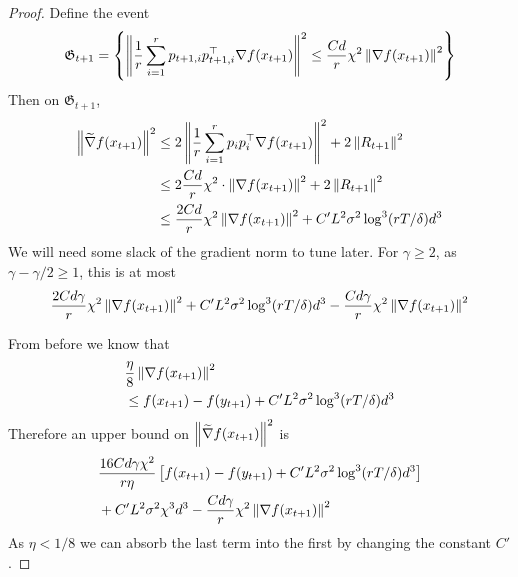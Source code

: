 \begin{proof}
    Define the event
    \begin{align*}
        \mathfrak G_{t+1} = \left\{\left\lVert \frac 1r \sum_{i=1}^r p_{t+1,i}p_{t+1,i}^\top \nabla f(x_{t+1}) \right\rVert^2 \leq \frac{Cd}{r} \chi^2 \left\lVert \nabla f(x_{t+1}) \right\rVert^2\right\}
    \end{align*}
    Then on $\mathfrak G_{t+1}$, 
    \begin{align*}
        \left\lVert \widetilde{\nabla} f(x_{t+1}) \right\rVert^2 &\leq 2\left\lVert \frac 1r \sum_{i=1}^r p_ip_i^\top \nabla f(x_{t+1}) \right\rVert^2 + 2 \left\lVert R_{t+1} \right\rVert^2 \\
        &\leq 2 \frac{Cd}{r} \chi^2 \cdot \left\lVert \nabla f(x_{t+1}) \right\rVert^2 + 2 \left\lVert R_{t+1} \right\rVert^2 \\
        &\leq \frac{2Cd}{r} \chi^2 \left\lVert \nabla f(x_{t+1}) \right\rVert^2 + C'L^2 \sigma^2 \log^{3}(rT/\delta) d^{3}
    \end{align*}
    We will need some slack of the gradient norm to tune later. For $\gamma \geq 2$, as $\gamma - \gamma/2 \geq 1$, this is at most
    \begin{align*}
        \frac{2Cd\gamma}{r} \chi^2 \left\lVert \nabla f(x_{t+1}) \right\rVert^2 + C'L^2 \sigma^2 \log^{3}(rT/\delta) d^{3} - \frac{Cd\gamma}{r} \chi^2 \left\lVert \nabla f(x_{t+1}) \right\rVert^2
    \end{align*}
    
    From before we know that
    \begin{align*}
        &\frac{\eta}{8} \left\lVert \nabla f(x_{t+1}) \right\rVert^2
        \\&\leq f(x_{t+1}) - f(y_{t+1}) + C'L^2 \sigma^2 \log^3(rT/\delta) d^3
    \end{align*}
    Therefore an upper bound on $\left\lVert \widetilde{\nabla} f(x_{t+1}) \right\rVert^2$ is
    \begin{align*}
        &\frac{16Cd\gamma \chi^2}{r \eta} \left[f(x_{t+1}) - f(y_{t+1}) + C'L^2 \sigma^2 \log^3(rT/\delta) d^3\right]  
        \\&+ C'L^2 \sigma^2 \chi^3 d^3 - \frac{Cd\gamma}{r} \chi^2 \left\lVert \nabla f(x_{t+1}) \right\rVert^2
    \end{align*}
    As $\eta < 1/8$ we can absorb the last term into the first by changing the constant $C'$. 
    

\end{proof}
